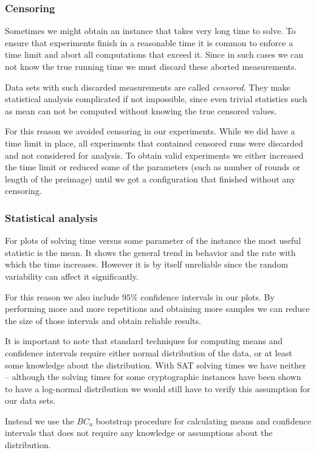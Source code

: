 \subsubsection{Censoring}
Sometimes we might obtain an instance that takes very long time to solve.
To ensure that experiments finish in a reasonable time it is common to enforce a time limit and abort all computations that exceed it.
Since in such cases we can not know the true running time we must discard these aborted measurements.

Data sets with such discarded measurements are called \emph{censored}.
They make statistical analysis complicated if not impossible, since even trivial statistics such as mean can not be computed without knowing the true censored values.

For this reason we avoided censoring in our experiments.
While we did have a time limit in place, all experiments that contained censored runs were discarded and not considered for analysis.
To obtain valid experiments we either increased the time limit or reduced some of the parameters (such as number of rounds or length of the preimage) until we got a configuration that finished without any censoring.

\subsubsection{Statistical analysis}
For plots of solving time versus some parameter of the instance the most useful statistic is the mean.
It shows the general trend in behavior and the rate with which the time increases.
However it is by itself unreliable since the random variability can affect it significantly.

For this reason we also include $95\%$ confidence intervals in our plots.
By performing more and more repetitions and obtaining more samples we can reduce the size of those intervals and obtain reliable results.

It is important to note that standard techniques for computing means and confidence intervals require either normal distribution of the data, or at least some knowledge about the distribution.
With SAT solving times we have neither -- although the solving times for some cryptographic instances have been shown \cite{bard2007efficient} to have a log-normal distribution we would still have to verify this assumption for our data sets.

Instead we use the $BC_a$ bootstrap procedure \cite{diciccio1996bootstrap} for calculating means and confidence intervals that does not require any knowledge or assumptions about the distribution.

